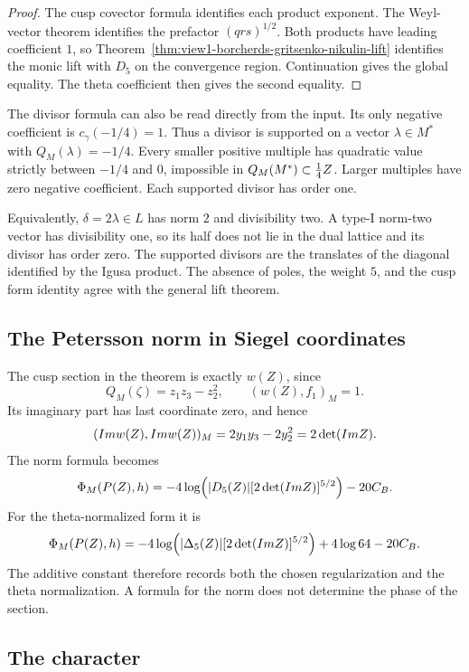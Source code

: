 \begin{proof}
The cusp covector formula identifies each product exponent.
The Weyl-vector theorem identifies the prefactor \((qrs)^{1/2}\).
Both products have leading coefficient \(1\), so
Theorem~\ref{thm:view1-borcherds-gritsenko-nikulin-lift}
identifies the monic lift with \(D_5\) on the convergence region.
Continuation gives the global equality.
The theta coefficient then gives the second equality.
\end{proof}

The divisor formula can also be read directly from the input.
Its only negative coefficient is \(c_\gamma(-1/4)=1\).
Thus a divisor is supported on a vector
\(\lambda\in M^*\) with \(Q_M(\lambda)=-1/4\).
Every smaller positive multiple has quadratic value strictly between
\(-1/4\) and \(0\), impossible in \(Q_M(M^*)\subset\frac14Z\).
Larger multiples have zero negative coefficient.
Each supported divisor has order one.

Equivalently, \(\delta=2\lambda\in L\) has norm \(2\) and
divisibility two.  A type-I norm-two vector has divisibility one,
so its half does not lie in the dual lattice and its divisor has
order zero.  The supported divisors are the translates of the
diagonal identified by the Igusa product.  The absence of poles,
the weight \(5\), and the cusp form identity agree with the
general lift theorem.

\subsection{The Petersson norm in Siegel coordinates}

The cusp section in the theorem is exactly \(w(Z)\), since
\[
 Q_M(\zeta)=z_1z_3-z_2^2,\qquad (w(Z),f_1)_M=1.
\]
Its imaginary part has last coordinate zero, and hence
\[
 (Im w(Z),Im w(Z))_M
 =2y_1y_3-2y_2^2=2\det(Im Z).
\]
The norm formula becomes
\[
 \Phi_M(P(Z),h)
 =-4\log\!\left(|D_5(Z)|[2\det(Im Z)]^{5/2}\right)
   -20C_B.
\]
For the theta-normalized form it is
\[
 \Phi_M(P(Z),h)
 =-4\log\!\left(|\Delta_5(Z)|[2\det(Im Z)]^{5/2}\right)
   +4\log64-20C_B.
\]
The additive constant therefore records both the chosen
regularization and the theta normalization.  A formula for the norm
does not determine the phase of the section.

\subsection{The character}
\label{ssec:consistency-conventions}

